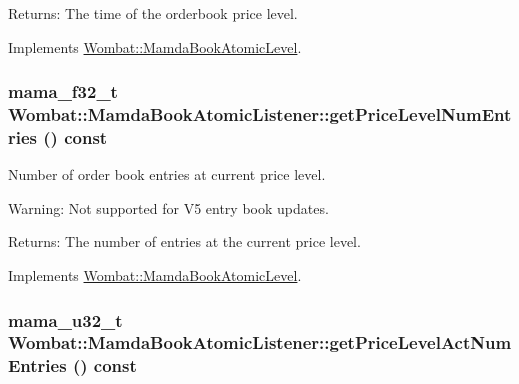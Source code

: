\begin{Desc}
\item[Returns:]The time of the orderbook price level. \end{Desc}


Implements \hyperlink{classWombat_1_1MamdaBookAtomicLevel_8eebd8c5bc48668b4f42afdcfa2e11ff}{Wombat::Mamda\-Book\-Atomic\-Level}.\hypertarget{classWombat_1_1MamdaBookAtomicListener_85367024e7790ce720c241849bf38ec2}{
\subsubsection[getPriceLevelNumEntries]{\setlength{\rightskip}{0pt plus 5cm}mama\_\-f32\_\-t Wombat::Mamda\-Book\-Atomic\-Listener::get\-Price\-Level\-Num\-Entries () const}}
\label{classWombat_1_1MamdaBookAtomicListener_85367024e7790ce720c241849bf38ec2}


Number of order book entries at current price level. 

\begin{Desc}
\item[Warning:]Not supported for V5 entry book updates.\end{Desc}
\begin{Desc}
\item[Returns:]The number of entries at the current price level. \end{Desc}


Implements \hyperlink{classWombat_1_1MamdaBookAtomicLevel_8a11dfebeccc889960a783b7e4377735}{Wombat::Mamda\-Book\-Atomic\-Level}.\hypertarget{classWombat_1_1MamdaBookAtomicListener_0ea6d18818fa9ec05f3e678e0aa58a35}{
\subsubsection[getPriceLevelActNumEntries]{\setlength{\rightskip}{0pt plus 5cm}mama\_\-u32\_\-t Wombat::Mamda\-Book\-Atomic\-Listener::get\-Price\-Level\-Act\-Num\-Entries () const}}
\label{classWombat_1_1MamdaBookAtomicListener_0ea6d18818fa9ec05f3e678e0aa58a35}




